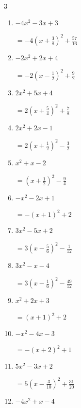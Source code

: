 \begin{multicols}{3}
\begin{enumerate}
        $\displaystyle =-\left( x-2\right)^{2}+3$

  \item $-4x^{2}-3x+3$

        $\displaystyle =-4\left( x+\frac{3}{8}\right)^{2}+\frac{57}{16}$

  \item $-2x^{2}+2x+4$

        $\displaystyle =-2\left( x-\frac{1}{2}\right)^{2}+\frac{9}{2}$

  \item $2x^{2}+5x+4$

        $\displaystyle =2\left( x+\frac{5}{4}\right)^{2}+\frac{7}{8}$

\columnbreak %

  \item $2x^{2}+2x-1$

        $\displaystyle =2\left( x+\frac{1}{2}\right)^{2}-\frac{3}{2}$

  \item $x^{2}+x-2$

        $\displaystyle =\left( x+\frac{1}{2}\right)^{2}-\frac{9}{4}$

  \item $-x^{2}-2x+1$

        $\displaystyle =-\left( x+1\right)^{2}+2$

  \item $3x^{2}-5x+2$

        $\displaystyle =3\left( x-\frac{5}{6}\right)^{2}-\frac{1}{12}$

  \item $3x^{2}-x-4$

        $\displaystyle =3\left( x-\frac{1}{6}\right)^{2}-\frac{49}{12}$

\columnbreak %

  \item $x^{2}+2x+3$

        $\displaystyle =\left( x+1\right)^{2}+2$

  \item $-x^{2}-4x-3$

        $\displaystyle =-\left( x+2\right)^{2}+1$

  \item $5x^{2}-3x+2$

        $\displaystyle =5\left( x-\frac{3}{10}\right)^{2}+\frac{31}{20}$

  \item $-4x^{2}+x-4$


\end{enumerate}
\end{multicols}
